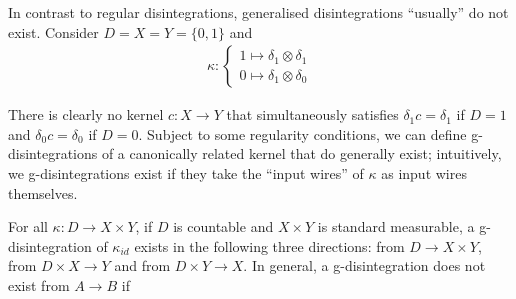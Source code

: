 In contrast to regular disintegrations, generalised disintegrations ``usually'' do not exist. Consider $D=X=Y=\{0,1\}$ and 
\begin{align}
	\kappa:\begin{cases} 1\mapsto \delta_1\otimes \delta_1\\
						 0\mapsto \delta_1\otimes \delta_0\end{cases}
\end{align}

There is clearly no kernel $c:X\to Y$ that simultaneously satisfies $\delta_1 c=\delta_1$ if $D=1$ and $\delta_0 c = \delta_0$ if $D=0$. Subject to some regularity conditions, we can define g-disintegrations of a canonically related kernel that do generally exist; intuitively, we g-disintegrations exist if they take the ``input wires'' of $\kappa$ as input wires themselves.

\begin{theorem}
For all $\kappa:D\to X\times Y$, if $D$ is countable and $X\times Y$ is standard measurable, a g-disintegration of $\kappa_{id}$ exists in the following three directions: from $D\to X\times Y$, from $D\times X\to Y$ and from $D\times Y\to X$. In general, a g-disintegration does not exist from $A\to B$ if 
\end{theorem}


